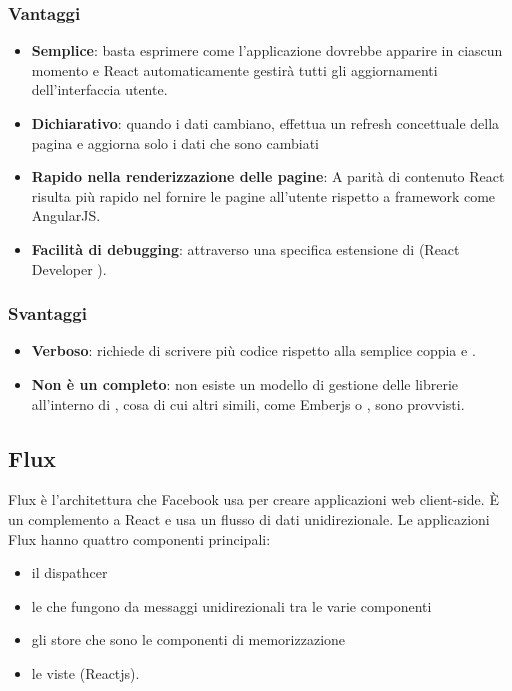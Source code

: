 \subsubsection{Vantaggi}
\begin{itemize}
\item \textbf{Semplice}: basta esprimere come l'applicazione dovrebbe apparire in ciascun momento e React automaticamente gestir\`a tutti gli aggiornamenti dell'interfaccia utente.
\item \textbf{Dichiarativo}: quando i dati cambiano,  effettua un refresh concettuale della pagina e aggiorna solo i dati che sono cambiati
\item \textbf{Rapido nella renderizzazione delle pagine}: A parità di contenuto React risulta più rapido nel fornire le pagine all'utente rispetto a framework come AngularJS.
\item \textbf{Facilit\`a di debugging}: attraverso una specifica estensione di  (React Developer ).
\end{itemize}
\subsubsection{Svantaggi}
\begin{itemize}
\item \textbf{Verboso}: richiede di scrivere pi\`u codice rispetto alla semplice coppia  e .
\item \textbf{Non \`e un  completo}: non esiste un modello di gestione delle librerie all'interno di , cosa di cui altri  simili, come Emberjs o , sono provvisti.
\end{itemize}

\subsection{Flux}
Flux è l'architettura che Facebook usa per creare applicazioni web client-side. È un complemento a React e usa un flusso di dati unidirezionale. Le applicazioni Flux hanno quattro componenti principali: 
\begin{itemize}
\item il dispathcer 
\item le  che fungono da messaggi unidirezionali tra le varie componenti
\item gli store che sono le componenti di memorizzazione
\item le viste (Reactjs).
\end{itemize}

